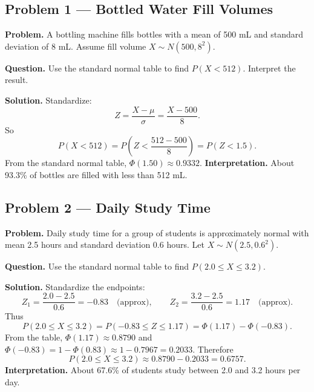 	
	\begin{ExamProblems}
		
		\hypertarget{c5-ex1}{}
		\item
		\subsection*{Problem 1 — Bottled Water Fill Volumes}
		
		\textbf{Problem.}
		A bottling machine fills bottles with a mean of 500 mL and standard deviation of 8 mL.
		Assume fill volume \(X\sim N(500,8^2)\).
		
		\textbf{Question.} Use the standard normal table to find \(P(X<512)\). Interpret the result.
		
		\textbf{Solution.}
		Standardize:
		\[
		Z=\frac{X-\mu}{\sigma}=\frac{X-500}{8}.
		\]
		So
		\[
		P(X<512)=P\left(Z<\frac{512-500}{8}\right)=P(Z<1.5).
		\]
		From the standard normal table, \(\Phi(1.50)\approx 0.9332\).
		\textbf{Interpretation.} About 93.3\% of bottles are filled with less than 512 mL.
		
		
		\hypertarget{c5-ex2}{}
		\item
		\subsection*{Problem 2 — Daily Study Time}
		
		\textbf{Problem.}
		Daily study time for a group of students is approximately normal with mean 2.5 hours
		and standard deviation 0.6 hours. Let \(X\sim N(2.5,0.6^2)\).
		
		\textbf{Question.} Use the standard normal table to find \(P(2.0\le X\le 3.2)\).
		
		\textbf{Solution.}
		Standardize the endpoints:
		\[
		Z_1=\frac{2.0-2.5}{0.6}=-0.83\quad\text{(approx)},\qquad
		Z_2=\frac{3.2-2.5}{0.6}=1.17\quad\text{(approx)}.
		\]
		Thus
		\[
		P(2.0\le X\le 3.2)=P(-0.83\le Z\le 1.17)
		=\Phi(1.17)-\Phi(-0.83).
		\]
		From the table, \(\Phi(1.17)\approx 0.8790\) and \(\Phi(-0.83)=1-\Phi(0.83)\approx 1-0.7967=0.2033\).
		Therefore
		\[
		P(2.0\le X\le 3.2)\approx 0.8790-0.2033=0.6757.
		\]
		\textbf{Interpretation.} About 67.6\% of students study between 2.0 and 3.2 hours per day.
		
	\end{ExamProblems}
	
